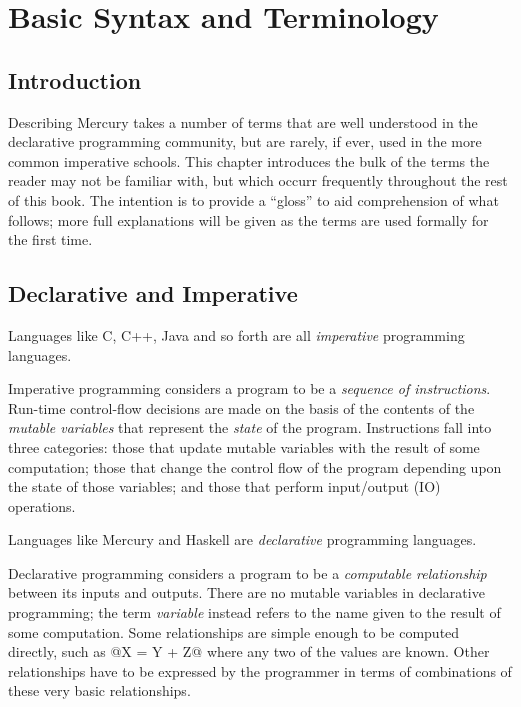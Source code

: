
\chapter{Basic Syntax and Terminology}



\section{Introduction}

Describing Mercury takes a number of terms that are well understood
in the declarative programming community, but are rarely, if ever, used
in the more common imperative schools.  This chapter introduces the bulk
of the terms the reader may not be familiar with, but which occurr
frequently throughout the rest of this book.  The intention is to
provide a ``gloss'' to aid comprehension of what follows; more full
explanations will be given as the terms are used formally for the first
time.



\section{Declarative and Imperative}

Languages like C, C++, Java and so forth are all \emph{imperative}
programming languages.

Imperative programming considers a program to be a \emph{sequence of
instructions}.  Run-time control-flow decisions are made on the basis of
the contents of the \emph{mutable variables} that represent the
\emph{state} of the program.  Instructions fall into three categories:
those that update mutable variables with the result of some computation;
those that change the control flow of the program depending upon the
state of those variables; and those that perform input/output (IO)
operations.

Languages like Mercury and Haskell are \emph{declarative} programming
languages.

Declarative programming considers a program to be a \emph{computable
relationship} between its inputs and outputs.  There are no mutable
variables in declarative programming; the term \emph{variable} instead
refers to the name given to the result of some computation.  Some
relationships are simple enough to be computed directly, such as
@X = Y + Z@ where any two of the values are known.  Other relationships
have to be expressed by the programmer in terms of combinations of these
very basic relationships.

